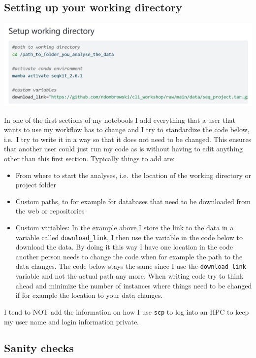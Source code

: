 \documentclass[
  letterpaper,
  DIV=11,
  numbers=noendperiod]{scrreprt}
\providecommand{\tightlist}{%
  \setlength{\itemsep}{0pt}\setlength{\parskip}{0pt}}\usepackage{longtable,booktabs,array}
\begin{document}
\subsection{Setting up your working
directory}\label{setting-up-your-working-directory}

\includegraphics[width=5.71875in,height=\textheight]{../img/general_setup.png}

In one of the first sections of my notebools I add everything that a
user that wants to use my workflow has to change and I try to
standardize the code below, i.e.~I try to write it in a way so that it
does not need to be changed. This ensures that another user could just
run my code as is without having to edit anything other than this first
section. Typically things to add are:

\begin{itemize}
\tightlist
\item
  From where to start the analyses, i.e.~the location of the working
  directory or project folder
\item
  Custom paths, to for example for databases that need to be downloaded
  from the web or repositories
\item
  Custom variables: In the example above I store the link to the data in
  a variable called \texttt{download\_link}, I then use the variable in
  the code below to download the data. By doing it this way I have one
  location in the code another person needs to change the code when for
  example the path to the data changes. The code below stays the same
  since I use the \texttt{download\_link} variable and not the actual
  path any more. When writing code try to think ahead and minimize the
  number of instances where things need to be changed if for example the
  location to your data changes.
\end{itemize}

I tend to NOT add the information on how I use \texttt{scp} to log into
an HPC to keep my user name and login information private.

\subsection{Sanity checks}\label{sanity-checks}
\end{document}
